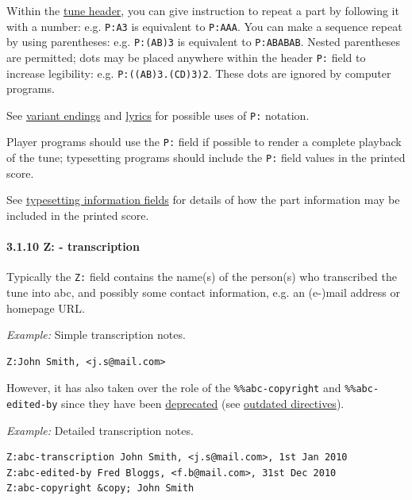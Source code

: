 \documentclass[oneside]{book}
\let\oldparagraph\paragraph
\renewcommand{\paragraph}[1]{\oldparagraph{#1}\mbox{}}
\begin{document}
Within the \protect\hyperlink{tune_header_definition}{tune header}, you
can give instruction to repeat a part by following it with a number:
e.g. \texttt{P:A3} is equivalent to \texttt{P:AAA}. You can make a
sequence repeat by using parentheses: e.g. \texttt{P:(AB)3} is
equivalent to \texttt{P:ABABAB}. Nested parentheses are permitted; dots
may be placed anywhere within the header \texttt{P:} field to increase
legibility: e.g. \texttt{P:((AB)3.(CD)3)2}. These dots are ignored by
computer programs.

See \protect\hyperlink{variant_endings}{variant endings} and
\protect\hyperlink{lyrics}{lyrics} for possible uses of \texttt{P:}
notation.

Player programs should use the \texttt{P:} field if possible to render a
complete playback of the tune; typesetting programs should include the
\texttt{P:} field values in the printed score.

See \protect\hyperlink{typesetting_information_fields}{typesetting
information fields} for details of how the part information may be
included in the printed score.

\hypertarget{ztranscription}{\paragraph{3.1.10 Z: -
transcription}\label{ztranscription}}

Typically the \texttt{Z:} field contains the name(s) of the person(s)
who transcribed the tune into abc, and possibly some contact
information, e.g. an (e-)mail address or homepage URL.

\emph{Example:} Simple transcription notes.

\begin{verbatim}
Z:John Smith, <j.s@mail.com>
\end{verbatim}

However, it has also taken over the role of the
\texttt{\%\%abc-copyright} and \texttt{\%\%abc-edited-by} since they
have been \protect\hyperlink{outdated_syntax}{deprecated} (see
\protect\hyperlink{outdated_directives}{outdated directives}).

\emph{Example:} Detailed transcription notes.

\begin{verbatim}
Z:abc-transcription John Smith, <j.s@mail.com>, 1st Jan 2010
Z:abc-edited-by Fred Bloggs, <f.b@mail.com>, 31st Dec 2010
Z:abc-copyright &copy; John Smith
\end{verbatim}
\end{document}
